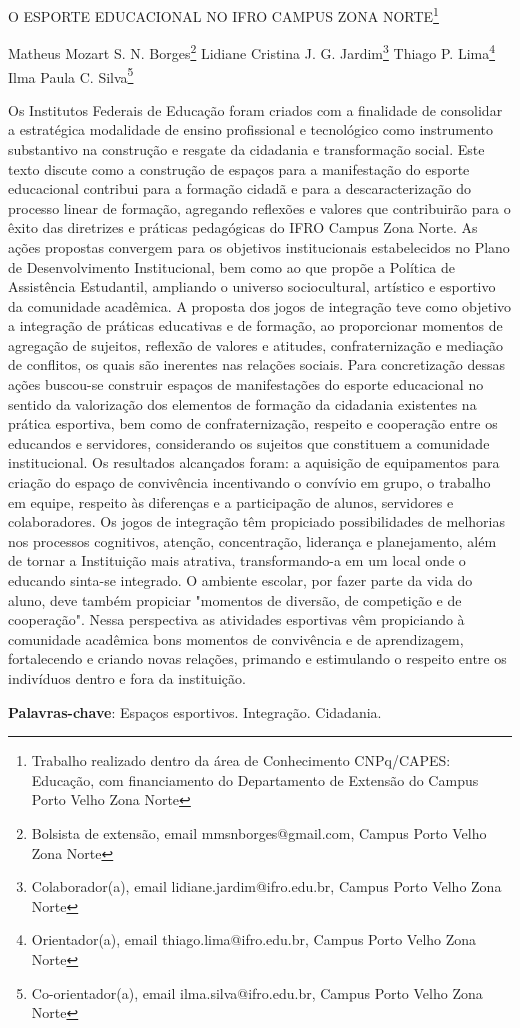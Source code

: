 \documentclass[article,12pt,onesidea,4paper,english,brazil]{abntex2}
\begin{document}
	
	
	\frenchspacing 
	
	\begin{center}
		\LARGE O ESPORTE EDUCACIONAL NO IFRO CAMPUS ZONA NORTE\footnote{Trabalho realizado dentro da área de Conhecimento CNPq/CAPES: Educação, com financiamento do Departamento de Extensão do Campus Porto Velho Zona Norte}
		
		\normalsize
		Matheus Mozart S. N. Borges\footnote{Bolsista de extensão, email mmsnborges@gmail.com, Campus Porto Velho Zona Norte} 
		Lidiane Cristina J. G. Jardim\footnote{Colaborador(a), email lidiane.jardim@ifro.edu.br, Campus Porto Velho Zona Norte} 
		Thiago P. Lima\footnote{Orientador(a), email thiago.lima@ifro.edu.br, Campus Porto Velho Zona Norte} 
		Ilma Paula C. Silva\footnote{Co-orientador(a), email ilma.silva@ifro.edu.br, Campus Porto Velho Zona Norte} 
	\end{center}
	
	\noindent Os Institutos Federais de Educação foram criados com a finalidade de consolidar a estratégica modalidade de ensino profissional e tecnológico como instrumento substantivo na construção e resgate da cidadania e transformação social. Este texto discute como a construção de espaços para a manifestação do esporte educacional contribui para a formação cidadã e para a descaracterização do processo linear de formação, agregando reflexões e valores que contribuirão para o êxito das diretrizes e práticas pedagógicas do IFRO Campus Zona Norte. As ações propostas convergem para os objetivos institucionais estabelecidos no Plano de Desenvolvimento Institucional, bem como ao que propõe a Política de Assistência Estudantil, ampliando o universo sociocultural, artístico e esportivo da comunidade acadêmica. A proposta dos jogos de integração teve como objetivo a integração de práticas educativas e de formação, ao proporcionar momentos de agregação de sujeitos, reflexão de valores e atitudes, confraternização e mediação de conflitos, os quais são inerentes nas relações sociais. Para concretização dessas ações buscou-se construir espaços de manifestações do esporte educacional no sentido da valorização dos elementos de formação da cidadania existentes na prática esportiva, bem como de confraternização, respeito e cooperação entre os educandos e servidores, considerando os sujeitos que constituem a comunidade institucional. Os resultados alcançados foram: a aquisição de equipamentos para criação do espaço de convivência incentivando o convívio em grupo, o trabalho em equipe, respeito às diferenças e a participação de alunos, servidores e colaboradores. Os jogos de integração têm propiciado possibilidades de melhorias nos processos cognitivos, atenção, concentração, liderança e planejamento, além de tornar a Instituição mais atrativa, transformando-a em um local onde o educando sinta-se integrado. O ambiente escolar, por fazer parte da vida do aluno, deve também propiciar "momentos de diversão, de competição e de cooperação". Nessa perspectiva as atividades esportivas vêm propiciando à comunidade acadêmica bons momentos de convivência e de aprendizagem, fortalecendo e criando novas relações, primando e estimulando o respeito entre os indivíduos dentro e fora da instituição.
	
	\vspace{\onelineskip}
	
	\noindent
	\textbf{Palavras-chave}: Espaços esportivos. Integração. Cidadania.
	
\end{document}
